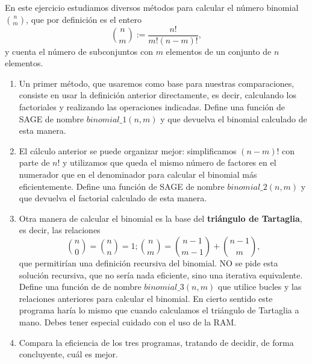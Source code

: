 	\begin{ejer}
	En este ejercicio estudiamos diversos métodos para calcular el número binomial $\binom{n}{m}$, que por definición es el entero $$\binom{n}{m}:=\frac{n!}{m!(n-m)!},$$ y cuenta el número de subconjuntos con $m$ elementos de un conjunto de $n$ elementos. 

	\begin{enumerate}
	\item  Un primer método,  que usaremos como base para nuestras comparaciones, consiste en usar la definición anterior
	directamente, es decir, calculando los factoriales y realizando las operaciones indicadas. Define una función de SAGE de nombre $binomial\_1(n,m)$ y que devuelva el binomial calculado de esta manera. 
	
	\item  El cálculo anterior se puede organizar mejor: simplificamos $(n-m)!$ con parte de $n!$ y utilizamos que queda el mismo número de factores en el numerador que en el denominador para calcular el binomial más eficientemente. Define una función de SAGE de nombre $binomial\_2(n,m)$ y que devuelva el factorial calculado de esta manera. 
	
	\item  Otra manera de calcular el binomial es la base del {\bf triángulo de Tartaglia}, es decir, las relaciones 
	$$\binom{n}{0}=\binom{n}{n}=1;\binom{n}{m}=\binom{n-1}{m-1}+\binom{n-1}{m},$$
	que permitirían una definición recursiva del binomial. NO se pide esta solución recursiva, que no sería nada eficiente,  sino una iterativa equivalente. Define una función de {\sage}  de nombre $binomial\_3(n,m)$ que utilice bucles y las relaciones anteriores para calcular el binomial. En cierto sentido este programa haría  lo mismo que cuando calculamos el triángulo de Tartaglia a mano. Debes tener especial cuidado con el uso de la RAM. 
	\item Compara la eficiencia de los tres programas,  tratando de decidir, de forma concluyente, cuál es mejor. 
	\end{enumerate}	
		
	\end{ejer}	
	
